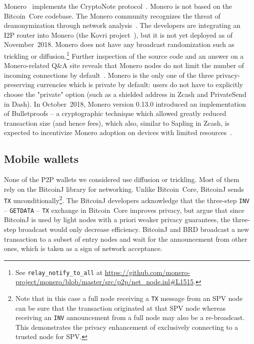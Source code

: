 Monero~\cite{Monero} implements the CryptoNote protocol~\cite{Saberhagen2013}.
Monero is not based on the Bitcoin~Core codebase.
The Monero community recognizes the threat of deanonymization through network analysis~\cite{user36432017, manontheinside2016, expez2016, Cameron2016}.
The developers are integrating an I2P router into Monero (the Kovri project~\cite{Kovri}), but it is not yet deployed as of November~2018.
Monero does not have any broadcast randomization such as trickling or diffusion.\footnote{See \texttt{relay\_notify\_to\_all} at \url{https://github.com/monero-project/monero/blob/master/src/p2p/net_node.inl\#L1515}.}%
Further inspection of the source code and an answer on a Monero-related Q\&A site reveals that Monero nodes do not limit the number of incoming connections by default~\cite{user363032016}.
Monero is the only one of the three privacy-preserving currencies which is private by default: users do not have to explicitly choose the "private" option (such as a shielded address in Zcash and PrivateSend in Dash).
In October~2018, Monero version 0.13.0 introduced an implementation of Bulletproofs -- a cryptographic technique which allowed greatly reduced transaction size (and hence fees), which also, similar to Sapling in Zcash, is expected to incentivize Monero adoption on devices with limited resources~\cite{Spagni2018}.


\subsection{Mobile wallets}

None of the P2P wallets we considered use diffusion or trickling.
Most of them rely on the BitcoinJ library for networking.
Unlike Bitcoin~Core, BitcoinJ sends \texttt{TX} unconditionally\footnote{Note that in this case a full node receiving a \texttt{TX} message from an SPV node can be sure that the transaction originated at that SPV node whereas receiving an \texttt{INV} announcement from a full node may also be a re-broadcast. This demonstrates the privacy enhancement of exclusively connecting to a trusted node for SPV.}.
The BitcoinJ developers acknowledge that the three-step \texttt{INV} -- \texttt{GETDATA} -- \texttt{TX} exchange in Bitcoin~Core improves privacy, but argue that since BitcoinJ is used by light nodes with a priori weaker privacy guarantees, the three-step broadcast would only decrease efficiency.
BitcoinJ and BRD broadcast a new transaction to a subset of entry nodes and wait for the announcement from other ones, which is taken as a sign of network acceptance.


